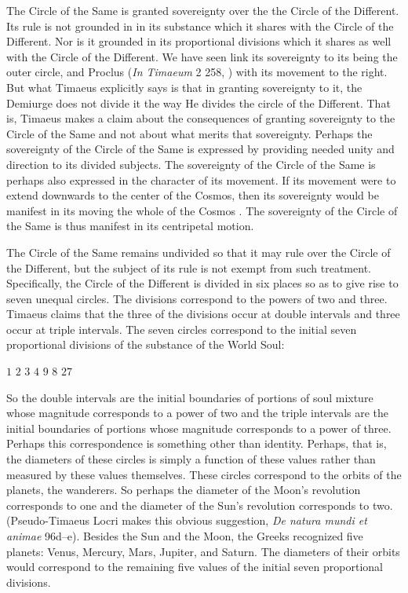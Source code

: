 The Circle of the Same is granted sovereignty over the the Circle of the Different. Its rule is not grounded in in its substance which it shares with the Circle of the Different. Nor is it grounded in its proportional divisions which it shares as well with the Circle of the Different. We have seen \citet[112 n3]{Archer-Hind:1888qd} link its sovereignty to its being the outer circle, and Proclus (\emph{In Timaeum} 2 258, \citealt{Diehl:1903re}) with its movement to the right. But what Timaeus explicitly says is that in granting sovereignty to it, the Demiurge does not divide it the way He divides the circle of the Different. That is, Timaeus makes a claim about the consequences of granting sovereignty to the Circle of the Same and not about what merits that sovereignty. Perhaps the sovereignty of the Circle of the Same is expressed by providing needed unity and direction to its divided subjects. The sovereignty of the Circle of the Same is perhaps also expressed in the character of its movement. If its movement were to extend downwards to the center of the Cosmos, then its sovereignty would be manifest in its moving the whole of the Cosmos \citep[76]{Cornford:1935fk}. The sovereignty of the Circle of the Same is thus manifest in its centripetal motion.

The Circle of the Same remains undivided so that it may rule over the Circle of the Different, but the subject of its rule is not exempt from such treatment. Specifically, the Circle of the Different is divided in six places so as to give rise to seven unequal circles. The divisions correspond to the powers of two and three. Timaeus claims that the three of the divisions occur at double intervals and three occur at triple intervals. The seven circles correspond to the initial seven proportional divisions of the substance of the World Soul:
\begin{center}
	\( 1 \) \( 2 \) \( 3 \) \( 4 \) \( 9 \) \( 8 \) \( 27 \)
\end{center}
So the double intervals are the initial boundaries of portions of soul mixture whose magnitude corresponds to a power of two and the triple intervals are the initial boundaries of portions whose magnitude corresponds to a power of three. Perhaps this correspondence is something other than identity. Perhaps, that is, the diameters of these circles is simply a function of these values rather than measured by these values themselves. These circles correspond to the orbits of the planets, the wanderers. So perhaps the diameter of the Moon's revolution corresponds to one and the diameter of the Sun's revolution corresponds to two. (Pseudo-Timaeus Locri makes this obvious suggestion, \emph{De natura mundi et animae} 96d--e). Besides the Sun and the Moon, the Greeks recognized five planets: Venus, Mercury, Mars, Jupiter, and Saturn. The diameters of their orbits would correspond to the remaining five values of the initial seven proportional divisions.

